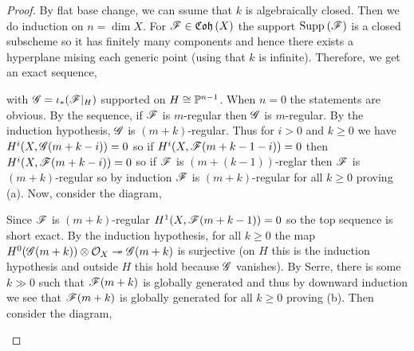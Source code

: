 \documentclass[12pt]{article}
\begin{document}
\begin{proof}
By flat base change, we can ssume that $k$ is algebraically closed. Then we do induction on $n = \dim{X}$. For $\F \in \Coh{X}$ the support $\Supp{}{\F}$ is a closed subscheme so it has finitely many components and hence there exists a hyperplane mising each generic point (using that $k$ is infinite). Therefore, we get an exact sequence,
\begin{center}
\end{center}
with $\G = \iota_* (\F|_{H})$ supported on $H \cong \P^{n-1}$. When $n = 0$ the statements are obvious. By the sequence, if $\F$ is $m$-regular then $\G$ is $m$-regular. By the induction hypothesis, $\G$ is $(m+k)$-regular. Thus for $i > 0$ and $k \ge 0$ we have $H^i(X, \G(m+k-i)) = 0$ so if $H^i(X, \F(m+k-1-i)) = 0$ then $H^i(X, \F(m+k-i)) = 0$ so if $\F$ is $(m+(k-1))$-reglar then $\F$ is $(m+k)$-regular so by induction $\F$ is $(m+k)$-regular for all $k \ge 0$ proving (a). Now, consider the diagram,
\begin{center}
\end{center}
Since $\F$ is $(m+k)$-regular $H^1(X, \F(m+k-1)) = 0$ so the top sequence is short exact. By the induction hypothesis, for all $k \ge 0$ the map $H^0(\G(m+k)) \ot \struct{X} \onto \G(m+k)$ is surjective (on $H$ this is the induction hypothesis and outside $H$ this hold because $\G$ vanishes). By Serre, there is some $k \gg 0$ such that $\F(m+k)$ is globally generated and thus by downward induction we see that $\F(m+k)$ is globally generated for all $k \ge 0$ proving (b). Then consider the diagram,
\begin{center}
\end{center}
\end{proof}
\end{document}
